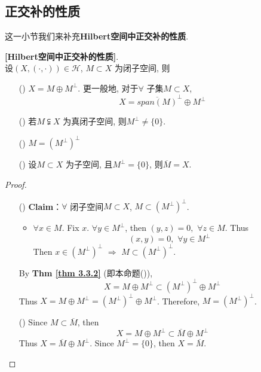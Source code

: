 \newpage

\subsection{正交补的性质}
	这一小节我们来补充\textbf{Hilbert空间中正交补的性质}. 
	
	\vspace{1em}
	
	\begin{proposition}\label{prop 3.3.2}
		\textbf{[Hilbert空间中正交补的性质]}. \\
		设$(X , (\cdot , \cdot)) \in \mathcal{H}$, $M \subset X$ 为闭子空间, 则
		
		\vspace{1em}
		
		\begin{enumerate}
			\item[(\rmnum{1})] $X = M \oplus M^{\perp}$. 更一般地, 对于$\forall$ 子集$M \subset X$, 
			\[ X = \overline{span(M)}^{\perp} \oplus M^{\perp} \]
			
			\item[(\rmnum{2})] 若$M \subsetneqq X$ 为真闭子空间, 则$M^{\perp} \neq \{ 0 \}$. 
			
			\item[(\rmnum{3})] $M = \left( M^{\perp} \right)^{\perp}$ 
			
			\item[(\rmnum{4})] 设$M \subset X$ 为子空间, 且$M^{\perp} = \{ 0 \}$, 则$\overline{M} = X$. 
		\end{enumerate}
		
		\vspace{6em}
		
		\begin{proof}
			\begin{enumerate}
				\item[(\rmnum{3})] \textbf{Claim}：$\forall$ 闭子空间$M \subset X$, $M \subset \left( M^{\perp} \right)^{\perp}$. 
				\begin{itemize}
					\item $\forall x \in M$. Fix $x$. $\forall y \in M^{\perp}$, then $(y , z) = 0 , \,\, \forall z \in M$. Thus
					\[ (x , y) = 0 , \,\, \forall y \in M^{\perp} \]
					Then $x \in \left( M^{\perp} \right)^{\perp} \,\, \Rightarrow \,\, M \subset \left( M^{\perp} \right)^{\perp}$. 
				\end{itemize}
				By \textbf{Thm \ref{thm 3.3.2}} (即本命题()), 
				\[ X = M \oplus M^{\perp} \subset \left( M^{\perp} \right)^{\perp} \oplus M^{\perp} \]
				Thus $X = M \oplus M^{\perp} = \left( M^{\perp} \right)^{\perp} \oplus M^{\perp}$. Therefore, $M = \left( M^{\perp} \right)^{\perp}$. 
				
				\vspace{5em}
				
				\item[(\rmnum{4})] Since $M \subset \overline{M}$, then 
				\[ X = M \oplus M^{\perp} \subset \overline{M} \oplus M^{\perp} \]
				Thus $X = \overline{M} \oplus M^{\perp}$. Since $M^{\perp} = \{ 0 \}$, then $X = \overline{M}$.
			\end{enumerate}
		\end{proof}
	\end{proposition}

